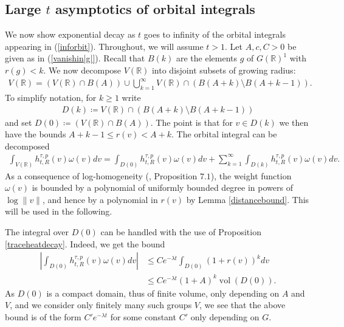 \documentclass[11pt,reqno]{amsart}
\numberwithin{equation}{section}
\theoremstyle{definition}
\theoremstyle{remark}
\newcommand{\vol}{\operatorname{vol}}
\newcommand{\R}{\mathbb{R}}
\begin{document}
\subsection*{Large $t$ asymptotics of orbital integrals}


We now show exponential decay as $t$ goes to infinity of the orbital integrals appearing in (\ref{inforbit}). Throughout, we will assume $t > 1$. Let $A,c,C>0$ be given as in (\ref{vanishin|g|}). Recall that $B(k)$ are the elements $g$ of $G(\R)^1$ with $r(g)< k$. We now decompose $V(\R)$ into disjoint subsets of growing radius:
\begin{align*}
    V(\R) = (V(\R)\cap B(A)) \cup \bigcup_{k=1}^\infty V(\R) \cap (B(A+k)\setminus B(A+k-1)).
\end{align*}
To simplify notation, for $k\geq 1$ write 
\begin{align*}
    D(k) \coloneqq  V(\R) \cap (B(A+k)\setminus B(A+k-1))
\end{align*}
and set $D(0)\coloneqq (V(\R)\cap B(A))$. The point is that for $v\in D(k)$ we then have the bounds $A+k-1\leq r(v)<A+k$. The orbital integral can be decomposed
\begin{align}\label{D(k)decomp}
    \int_{V(\R)} h^{\tau,p}_{t,R}(v)\omega(v)dv = \int_{D(0)} h^{\tau,p}_{t,R}(v)\omega(v)dv +\sum_{k=1}^\infty \int_{D(k)} h^{\tau,p}_{t,R}(v)\omega(v)dv.
\end{align}
\noindent As a consequence of log-homogeneity (\cite{MzM1}, Proposition $7.1$), the weight function $\omega(v)$ is bounded by a polynomial of uniformly bounded degree in powers of $\log\lVert v\rVert$, and hence by a polynomial in $r(v)$ by Lemma \ref{distancebound}. This will be used in the following.

The integral over $D(0)$ can be handled with the use of Proposition \ref{traceheatdecay}. Indeed, we get the bound
\begin{align*}
    \left\vert \int_{D(0)} h^{\tau,p}_{t,R}(v)\omega(v)dv\right\vert &\leq C e^{-\lambda t}\int_{D(0)} (1+r(v))^kdv \\
    &\leq Ce^{-\lambda t} (1+A)^k \vol(D(0)).
\end{align*}
As $D(0)$ is a compact domain, thus of finite volume, only depending on $A$ and $V$, and we consider only finitely many such groups $V$, we see that the above bound is of the form $C' e^{-\lambda t}$ for some constant $C'$ only depending on $G$. 
\end{document}
